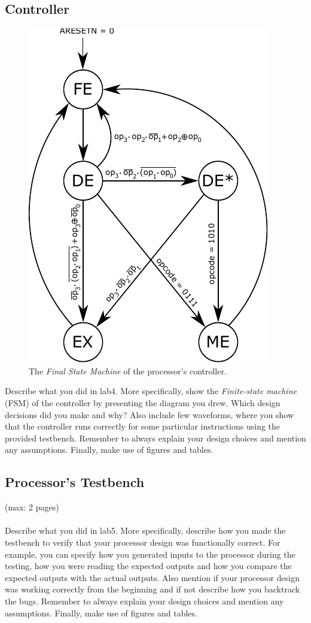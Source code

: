 \documentclass[a4,11pt]{article}
\begin{document}
\subsection{Controller}

\begin{figure}[h!]
	\centering
	\includegraphics[height=.5\textwidth]{Figurer/procController_FSM_Mealy}
	\caption{The {\it Final State Machine} of the processor's controller.}
	\label{fig:fsm}
\end{figure}

Describe what you did in lab4. More specifically, show the \emph{Finite-state machine} (FSM) of the controller by presenting the diagram you drew. Which design decisions did you make and why? Also include few waveforms, where you show that the controller runs correctly for some particular instructions using the provided testbench. Remember to always explain your design choices and mention any assumptions. Finally, make use of figures and tables. 

\subsection{Processor's Testbench}
(max: 2 pages)
\\\\
Describe what you did in lab5. More specifically, describe how you made the testbench to verify that your processor design was functionally correct. For example, you can specify how you generated inputs to the processor during the testing, how you were reading the expected outputs and how you compare the expected outputs with the actual outputs. Also mention if your processor design was working correctly from the beginning and if not describe how you backtrack the bugs. Remember to always explain your design choices and mention any assumptions. Finally, make use of figures and tables. 
\end{document}
